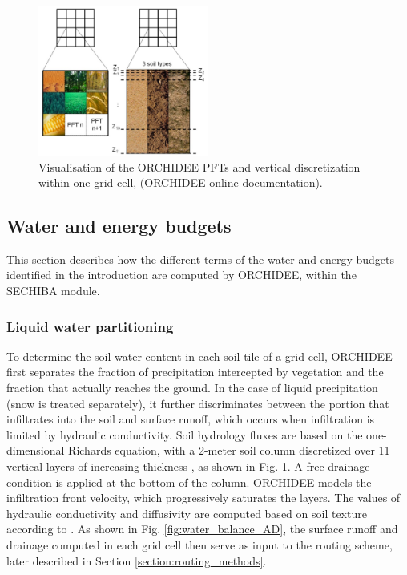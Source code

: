 \begin{figure}[hbtp]
    \centering
    \includegraphics[width=0.5\textwidth]{images/methods/ORC_discretization.png}
    \caption{Visualisation of the ORCHIDEE PFTs and vertical discretization within one grid cell, (\href{https://orchidee.ipsl.fr/introduction/}{ORCHIDEE online documentation}).}
    \label{fig:ORC_discretization}
\end{figure}

\subsection{Water and energy budgets}\label{sec:water}

This section describes how the different terms of the water and energy budgets identified in the introduction are computed by ORCHIDEE, within the SECHIBA module. 

\subsubsection*{Liquid water partitioning}

To determine the soil water content in each soil tile of a grid cell, ORCHIDEE first separates the fraction of precipitation intercepted by vegetation and the fraction that actually reaches the ground. In the case of liquid precipitation (snow is treated separately), 
it further discriminates between the portion that infiltrates into the soil and surface runoff, which occurs when infiltration is limited by hydraulic conductivity. Soil hydrology fluxes are based on the one-dimensional Richards equation, with a 2-meter soil column discretized over 11 vertical layers of increasing thickness \citep{de_rosnay_impact_2002, dorgeval_sensitivity_2008}, as shown in Fig. \ref{fig:ORC_discretization}. A free drainage condition is applied at the bottom of the column. ORCHIDEE models the infiltration front velocity, which progressively saturates the layers. The values of hydraulic conductivity and diffusivity are computed based on soil texture according to \citet{mualem_new_1976, van_genuchten_closed-form_1980}. As shown in Fig. \ref{fig:water_balance_AD}, the surface runoff and drainage computed in each grid cell then serve as input to the routing scheme, later described in Section \ref{section:routing_methods}.

